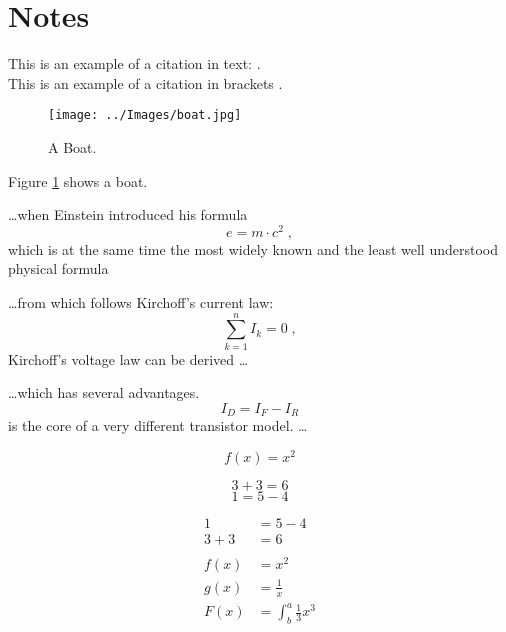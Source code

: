 

	\section{Notes}

	This is an example of a citation in text:	\cite{Reynolds:1987:FHS:37402.37406}.\\
	This is an example of a citation in brackets \citep{Reynolds:1987:FHS:37402.37406}.

	\begin{figure}
		\texttt{[image: ../Images/boat.jpg]}
		\caption{A Boat.}
		\label{fig:boat1}
	\end{figure}
	
	Figure \ref{fig:boat1} shows a boat.
		
	\ldots when Einstein introduced his formula
	\begin{equation}
		e = m \cdot c^2 \; ,
	\end{equation}
	which is at the same time the most widely known and the least
	well understood physical formula
	
	\ldots from which follows Kirchoff's current law:
	\begin{equation}
		\sum_{k=1}^{n} I_k = 0 \; ,
	\end{equation}
	Kirchoff's voltage law can be derived \ldots
	
	\ldots which has several advantages.
	\begin{equation}
		I_D = I_F - I_R
	\end{equation}
	is the core of a very different transistor model. \ldots
	
	\begin{equation}
		f(x) = x^2
	\end {equation}
	
	\begin{equation*}
		3+ 3 = 6
	\end {equation*}
	\begin{equation*}
		1 = 5 - 4
	\end {equation*}
	
	\begin{align*}
		1 &= 5 - 4\\ %
		3+ 3 &= 6\\ 
		\\
		f(x) &= x^2\\
  		g(x) &= \frac{1}{x}\\
  		F(x) &= \int^a_b \frac{1}{3}x^3
	\end {align*}